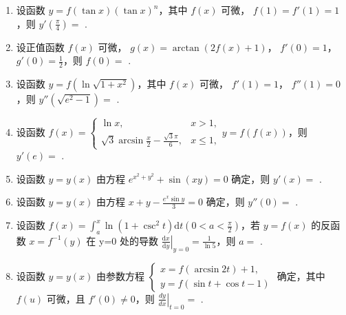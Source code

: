 \documentclass[12pt, a4paper]{ctexart}
\begin{document}
\begin{enumerate}[start=39]
    \item 设函数 $ y = f(\tan x)(\tan x)^n $，其中 $ f(x) $ 可微， $ f(1) = f'(1) = 1 $，则 $ y' \left( \frac{\pi}{4} \right) = $ \underline{\hspace{2cm}}.

    \item 设正值函数 $ f(x) $ 可微， $ g(x)=\arctan(2f(x)+1) $， $ f'(0)=1 $， $ g'(0)=\frac{1}{2} $，则 $ f(0)= $ \underline{\hspace{2cm}}.

    \item 设函数 $ y = f\left(\ln\sqrt{1 + x^2}\right) $，其中 $ f(x) $ 可微， $ f'(1) = 1 $， $ f''(1) = 0 $，则 $ y''\left(\sqrt{e^2 - 1}\right) = $ \underline{\hspace{2cm}}.

    \item 设函数 $ f(x) = \begin{cases} \ln x, & x > 1, \\ \sqrt{3} \arcsin \frac{x}{2} - \frac{\sqrt{3}\pi}{6}, & x \leq 1, \end{cases} y = f\left(f(x)\right) $，则 $ y'(e) = $ \underline{\hspace{2cm}}.

    \item 设函数 $ y = y(x) $ 由方程 $ e^{x^2 + y^2} + \sin(xy) = 0 $ 确定，则 $ y'(x) = $ \underline{\hspace{2cm}}.

    \item 设函数 $ y = y(x) $ 由方程 $ x + y - \frac{e^{x} \sin y}{3} = 0 $ 确定，则 $ y''(0) = $ \underline{\hspace{2cm}}.

    \item 设函数 $ f(x)=\int_{a}^{x}\ln\left(1+\csc^{2}t\right)\mathrm{d}t\left(0<a<\frac{\pi}{2}\right) $，若 $ y=f(x) $ 的反函数 $ x=f^{-1}(y) $ 在 y=0 处的导数 $ \left.\frac{\mathrm{d}x}{\mathrm{d}y}\right|_{y=0}=\frac{1}{\ln5} $，则 $ a= $ \underline{\hspace{2cm}}.

    \item 设函数 $ y = y(x) $ 由参数方程 $ \begin{cases} x = f(\arcsin 2t) + 1, \\ y = f(\sin t + \cos t - 1) \end{cases} $ 确定，其中 $ f(u) $ 可微，且 $ f'(0) \neq 0 $，则 $ \left. \frac{dy}{dx} \right|_{t=0} = $ \underline{\hspace{2cm}}.


\end{enumerate}
\end{document}
